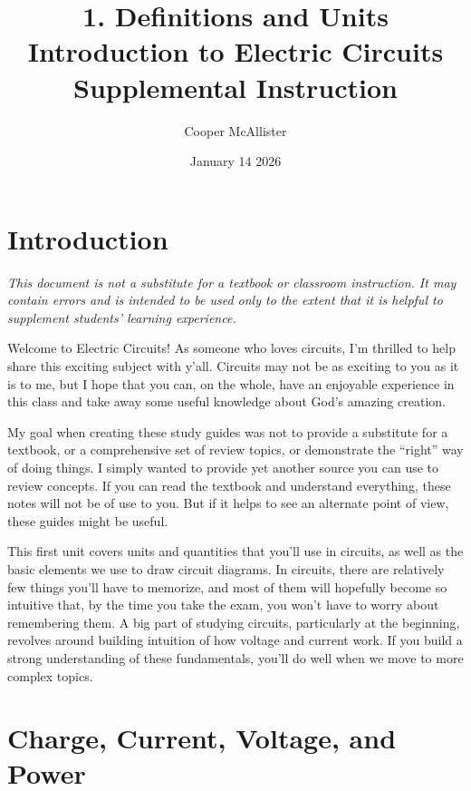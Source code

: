 \documentclass{article}
\title{1. Definitions and Units \\  \large Introduction to Electric Circuits \\ Supplemental Instruction}
\author{Cooper McAllister}
\date{January 14 2026}
\begin{document}
 {
	\fancyhf{}
	\renewcommand{\headrulewidth}{0pt}
	\renewcommand{\footrulewidth}{0.4pt}
	\fancyfoot[R]{\thepage}
}
\pagestyle{footerstyle}
\maketitle
\thispagestyle{footerstyle}
\section{Introduction}
\begin{center}
\textit{This document is not a substitute for a textbook or classroom instruction. It may contain errors and is intended to be used only to the extent that it is helpful to supplement students' learning experience.}
\end{center}
Welcome to Electric Circuits! As someone who loves circuits, I'm thrilled to help share this exciting subject with y'all. Circuits may not be as exciting to you as it is to me, but I hope that you can, on the whole, have an enjoyable experience in this class and take away some useful knowledge about God's amazing creation.

My goal when creating these study guides was not to provide a substitute for a textbook, or a comprehensive set of review topics, or demonstrate the ``right'' way of doing things. I simply wanted to provide yet another source you can use to review concepts. If you can read the textbook and understand everything, these notes will not be of use to you. But if it helps to see an alternate point of view, these guides might be useful.

This first unit covers units and quantities that you'll use in circuits, as well as the basic elements we use to draw circuit diagrams. In circuits, there are relatively few things you'll have to memorize, and most of them will hopefully become so intuitive that, by the time you take the exam, you won't have to worry about remembering them. A big part of studying circuits, particularly at the beginning, revolves around building intuition of how voltage and current work. If you build a strong understanding of these fundamentals, you'll do well when we move to more complex topics.

\section{Charge, Current, Voltage, and Power}
\end{document}
